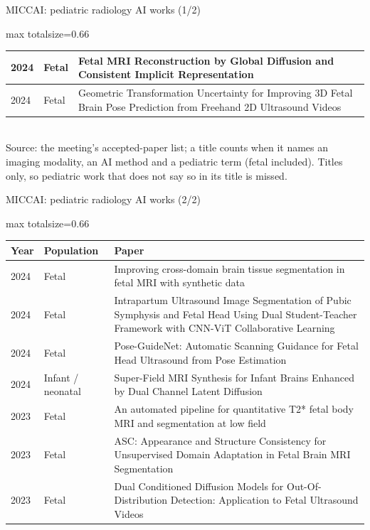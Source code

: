 \documentclass[aspectratio=169]{beamer}
\renewcommand{\arraystretch}{1.08}
\begin{document}
\begin{frame}[category=Conferences]{MICCAI: pediatric radiology AI works (1/2)}
\begin{adjustbox}{max totalsize={\textwidth}{0.66\textheight}}
\begin{tabular}{|l|l|>{\raggedright\arraybackslash}p{}|}
2024 & Fetal & Fetal MRI Reconstruction by Global Diffusion and Consistent Implicit Representation \\ \hline
2024 & Fetal & Geometric Transformation Uncertainty for Improving 3D Fetal Brain Pose Prediction from Freehand 2D Ultrasound Videos \\ \hline
\end{tabular}
\end{adjustbox}
\\[2pt]
{\tiny Source: the meeting's accepted-paper list; a title counts when it names an imaging modality, an AI method and a pediatric term (fetal included). Titles only, so pediatric work that does not say so in its title is missed.}
\end{frame}

\begin{frame}[category=Conferences]{MICCAI: pediatric radiology AI works (2/2)}
\vspace{2pt}
\tiny
\begin{adjustbox}{max totalsize={\textwidth}{0.66\textheight}}
\renewcommand{\arraystretch}{1.2}
\begin{tabular}{|l|l|>{\raggedright\arraybackslash}p{}|}
\hline \textbf{Year} & \textbf{Population} & \textbf{Paper} \\ \hline
2024 & Fetal & Improving cross-domain brain tissue segmentation in fetal MRI with synthetic data \\ \hline
2024 & Fetal & Intrapartum Ultrasound Image Segmentation of Pubic Symphysis and Fetal Head Using Dual Student-Teacher Framework with CNN-ViT Collaborative Learning \\ \hline
2024 & Fetal & Pose-GuideNet: Automatic Scanning Guidance for Fetal Head Ultrasound from Pose Estimation \\ \hline
2024 & Infant / neonatal & Super-Field MRI Synthesis for Infant Brains Enhanced by Dual Channel Latent Diffusion \\ \hline
2023 & Fetal & An automated pipeline for quantitative T2* fetal body MRI and segmentation at low field \\ \hline
2023 & Fetal & ASC: Appearance and Structure Consistency for Unsupervised Domain Adaptation in Fetal Brain MRI Segmentation \\ \hline
2023 & Fetal & Dual Conditioned Diffusion Models for Out-Of-Distribution Detection: Application to Fetal Ultrasound Videos \\ \hline

\end{tabular}
\end{adjustbox}
\end{frame}
\end{document}
